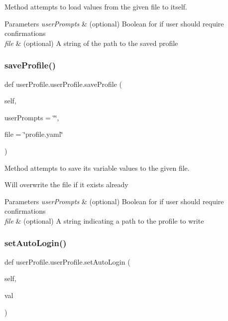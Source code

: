 Method attempts to load values from the given file to itself. 


\begin{DoxyParams}{Parameters}
{\em user\+Prompts} & (optional) Boolean for if user should require confirmations \\
\hline
{\em file} & (optional) A string of the path to the saved profile \\
\hline
\end{DoxyParams}
\mbox{\label{classuserProfile_1_1userProfile_aabe8e582214f44b0315fee65fb97a5a3}} 
\subsubsection{\texorpdfstring{save\+Profile()}{saveProfile()}}
{\footnotesize\ttfamily def user\+Profile.\+user\+Profile.\+save\+Profile (\begin{DoxyParamCaption}\item[{}]{self,  }\item[{}]{user\+Prompts = {\ttfamily \char`\"{}\char`\"{}},  }\item[{}]{file = {\ttfamily \char`\"{}profile.yaml\char`\"{}} }\end{DoxyParamCaption})}



Method attempts to save its variable values to the given file. 

Will overwrite the file if it exists already 
\begin{DoxyParams}{Parameters}
{\em user\+Prompts} & (optional) Boolean for if user should require confirmations \\
\hline
{\em file} & (optional) A string indicating a path to the profile to write \\
\hline
\end{DoxyParams}
\mbox{\label{classuserProfile_1_1userProfile_a069b4dcc551295eceac4eaef147d59f3}} 
\subsubsection{\texorpdfstring{set\+Auto\+Login()}{setAutoLogin()}}
{\footnotesize\ttfamily def user\+Profile.\+user\+Profile.\+set\+Auto\+Login (\begin{DoxyParamCaption}\item[{}]{self,  }\item[{}]{val }\end{DoxyParamCaption})}




